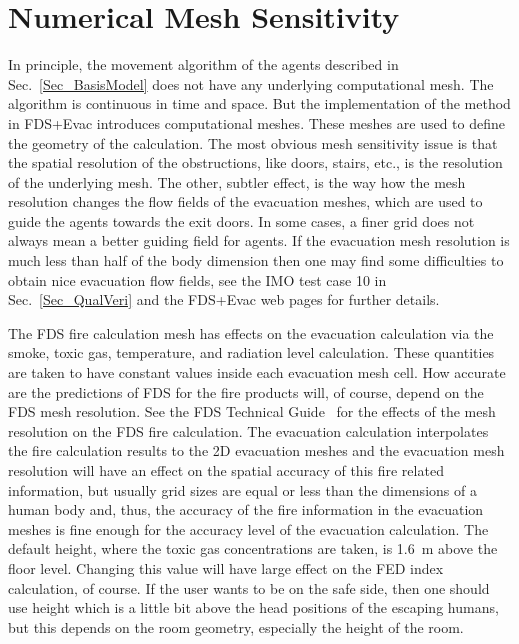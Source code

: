 \documentclass[12pt,a4paper,final,twoside]{stylevk}
\begin{document}
\section{Numerical Mesh Sensitivity}\label{Sec_GridSensi}

\noindent In principle, the movement algorithm of the agents described
in Sec.~\ref{Sec_BasisModel} does not have any underlying
computational mesh.  The algorithm is continuous in time and space.
But the implementation of the method in FDS+Evac introduces
computational meshes.  These meshes are used to define the geometry of
the calculation.  The most obvious mesh sensitivity issue is that the
spatial resolution of the obstructions, like doors, stairs,
etc., is the resolution of the underlying mesh.  The other,
subtler effect, is the way how the mesh resolution changes the flow
fields of the evacuation meshes, which are used to guide the agents
towards the exit doors.  In some cases, a finer grid does not always
mean a better guiding field for agents.  If the evacuation mesh
resolution is much less than half of the body dimension then one may
find some difficulties to obtain nice evacuation flow fields, see the
IMO test case 10 in Sec.~\ref{Sec_QualVeri} and the FDS+Evac web pages
for further details.


The FDS fire calculation mesh has effects on the evacuation
calculation via the smoke, toxic gas, temperature, and radiation level
calculation.  These quantities are taken to have constant values
inside each evacuation mesh cell.  How accurate are the predictions of
FDS for the fire products will, of course, depend on the FDS mesh
resolution.  See the FDS Technical Guide~\cite{FDS_Manual,
  FDS_VVGuide1, FDS_VVGuide2} for the effects of the mesh resolution
on the FDS fire calculation.  The evacuation calculation interpolates
the fire calculation results to the 2D evacuation meshes and the
evacuation mesh resolution will have an effect on the spatial accuracy
of this fire related information, but usually grid sizes are equal or
less than the dimensions of a human body and, thus, the accuracy of
the fire information in the evacuation meshes is fine enough for the
accuracy level of the evacuation calculation.  The default height,
where the toxic gas concentrations are taken, is 1.6~m above the floor
level.  Changing this value will have large effect on the FED index
calculation, of course.  If the user wants to be on the safe side,
then one should use height which is a little bit above the head
positions of the escaping humans, but this depends on the room
geometry, especially the height of the room.
\end{document}
